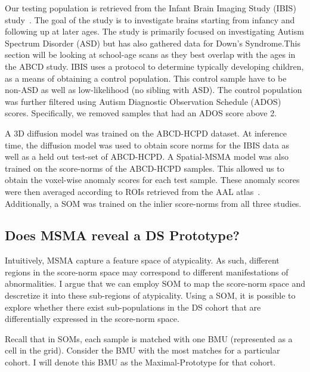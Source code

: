 Our testing population is retrieved from the Infant Brain Imaging Study (IBIS) study~. The goal of the study is to investigate brains starting from infancy and following up at later ages. The study is primarily focused on investigating Autism Spectrum Disorder (ASD) but has also gathered data for Down's Syndrome.This section will be looking at school-age scans as they best overlap with the ages in the ABCD study. IBIS uses a protocol to determine typically developing children, as a means of obtaining a control population. This control sample have to be non-ASD as well as low-likelihood (no sibling with ASD). The control population was further filtered using Autism Diagnostic Observation Schedule (ADOS)~ scores. Specifically, we removed samples that had an ADOS score above 2.

A 3D diffusion model was trained on the ABCD-HCPD dataset. At inference time, the diffusion model was used to obtain score norms for the IBIS data as well as a held out test-set of ABCD-HCPD. A Spatial-MSMA model was also trained on the score-norms of the ABCD-HCPD samples. This allowed us to obtain the voxel-wise anomaly scores for each test sample. These anomaly scores were then averaged according to ROIs retrieved from the AAL atlas~\cite{ROLLS2020116189}. Additionally, a SOM was trained on the inlier score-norms from all three studies. 


\subsection*{Does MSMA reveal a DS Prototype?}


Intuitively, MSMA capture a feature space of atypicality. As such, different regions in the score-norm space may correspond to different manifestations of abnormalities. I argue that we can employ SOM to map the score-norm space and descretize it into these sub-regions of atypicality. Using a SOM, it is possible to explore whether there exist sub-populations in the DS cohort that are differentially expressed in the score-norm space. 


Recall that in SOMs, each sample is matched with one BMU (represented as a cell in the grid). Consider the BMU with the most matches for a particular cohort. I will denote this BMU as the Maximal-Prototype for that cohort. 

